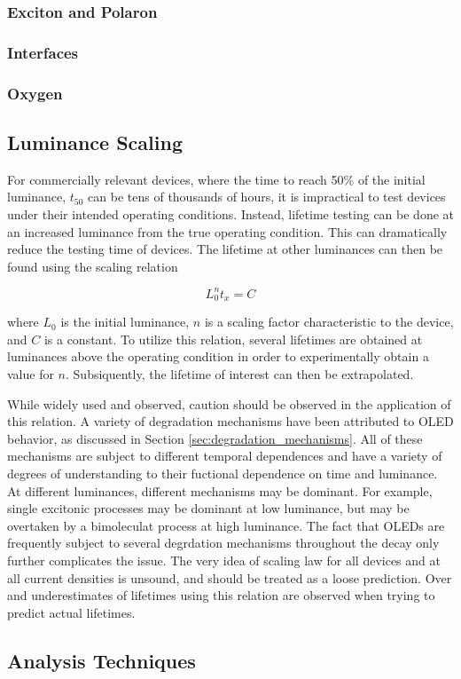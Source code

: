 \documentclass[../thesis.tex]{subfiles}
\begin{document}
\subsubsection{Exciton and Polaron}
\subsubsection{Interfaces}
\subsubsection{Oxygen}


\subsection{Luminance Scaling}\label{sec:luminance_scaling}
For commercially relevant devices, where the time to reach 50\% of the initial luminance, $t_{50}$ can be tens of thousands of hours, it is impractical to test devices under their intended operating conditions.
Instead, lifetime testing can be done at an increased luminance from the true operating condition.\cite{Scholz2015}
This can dramatically reduce the testing time of devices.
The lifetime at other luminances can then be found using the scaling relation

\begin{equation}
L_0^n t_x=C
\label{eqn:luminance_scaling}
\end{equation}

where $L_0$ is the initial luminance, $n$ is a scaling factor characteristic to the device, and $C$ is a constant.
To utilize this relation, several lifetimes are obtained at luminances above the operating condition in order to experimentally obtain a value for $n$.
Subsiquently, the lifetime of interest can then be extrapolated.

While widely used and observed, caution should be observed in the application of this relation.  
A variety of degradation mechanisms have been attributed to OLED behavior, as discussed in Section \ref{sec:degradation_mechanisms}.
All of these mechanisms are subject to different temporal dependences and have a variety of degrees of understanding to their fuctional dependence on time and luminance.
At different luminances, different mechanisms may be dominant.
For example, single excitonic processes may be dominant at low luminance, but may be overtaken by a bimoleculat process at high luminance.
The fact that OLEDs are frequently subject to several degrdation mechanisms throughout the decay only further complicates the issue.
The very idea of scaling law for all devices and at all current densities is unsound, and should be treated as a loose prediction.
Over and underestimates of lifetimes using this relation are observed when trying to predict actual lifetimes.\cite{Meerheim2006,Fry2005}


\subsection{Analysis Techniques}\label{sec:degradation_analysis}




\end{document}
